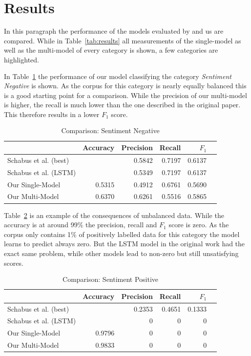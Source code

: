 \documentclass[11pt,a4paper]{article}
\begin{document}
\section{Results}

In this paragraph the performance of the models evaluated by  and us are compared.
While in Table~\ref{tab:results} all measurements of the single-model as well as the multi-model of every category is shown, a few categories are highlighted.

In Table~\ref{tab:results:sentiment_negative} the performance of our model classifying the category \textit{Sentiment Negative} is shown. As the corpus for this category is nearly equally balanced this is a good starting point for a comparison. 
While the precision of our multi-model is higher, the recall is much lower than the one described in the original paper. 
This therefore results in a lower $F_1$ score.
\begin{table}[h!]
	\centering\scriptsize
	\begin{tabular}{l r r r r r}
		& Accuracy & Precision & Recall & $F_1$ \\
		\hline
		Schabus et al. (best) & & 0.5842 & 0.7197 & 0.6137 \\
		Schabus et al. (LSTM) & & 0.5349 & 0.7197 & 0.6137 \\
		\hline
		Our Single-Model & 0.5315 & 0.4912 & 0.6761 & 0.5690 \\
		Our Multi-Model & 0.6370 & 0.6261 & 0.5516 & 0.5865 \\
	\end{tabular}  
	\caption{Comparison: Sentiment Negative}
	\label{tab:results:sentiment_negative}
\end{table}

Table~\ref{tab:results:sentiment_positive} is an example of the consequences of unbalanced data. While the accuracy is at around 99\% the precision, recall and $F_1$ score is zero. As the corpus only contains 1\% of positively labelled data for this category the model learns to predict always zero.
But the LSTM model in the original work had the exact same problem, while other models lead to non-zero but still unsatisfying scores.
\begin{table}[h!]
	\centering\scriptsize
	\begin{tabular}{l r r r r r}
		& Accuracy & Precision & Recall & $F_1$ \\
		\hline
		Schabus et al. (best) & & 0.2353 & 0.4651 & 0.1333 \\
		Schabus et al. (LSTM) & & 0 & 0 & 0\\
		\hline
		Our Single-Model & 0.9796 & 0 & 0 & 0 \\
		Our Multi-Model & 0.9833 & 0 & 0 & 0 \\
	\end{tabular}
	\caption{Comparison: Sentiment Positive}
	\label{tab:results:sentiment_positive}
\end{table}
\end{document}
